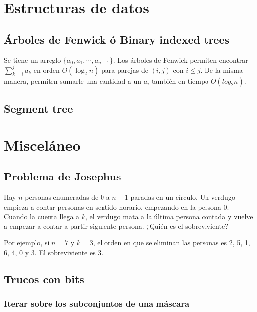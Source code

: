 \documentclass[10pt,letterpaper,twocolumn]{article}
\newcommand{\codigofuente}[1]{

\dotfill
}
\begin{document}
\section{Estructuras de datos}
\subsection{Árboles de Fenwick ó Binary indexed trees}

Se tiene un arreglo $\{a_0, a_1, \cdots, a_{n-1}\}$. Los árboles
de Fenwick permiten encontrar $ \displaystyle \sum_{k=i}^{j} a_k $ en orden $O(\log_{2}{n})$ para parejas de $(i, j)$ con $i \leq j$. De la misma manera, permiten sumarle una cantidad a un $a_i$ también en tiempo $O(log_{2}{n})$.
\medskip
\codigofuente{./src/estructuras/fenwick.cpp}

\subsection{Segment tree}
\codigofuente{./src/estructuras/segment_tree.cpp}

\section{Misceláneo}

\subsection{Problema de Josephus}

Hay $n$ personas enumeradas de $0$ a $n - 1$ paradas en un círculo. Un verdugo empieza a contar personas en sentido horario, empezando en la persona $0$. Cuando la cuenta llega a $k$, el verdugo mata a la última persona contada y vuelve a empezar a contar a partir siguiente persona. ¿Quién es el sobreviviente?

Por ejemplo, si $n = 7$ y $k = 3$, el orden en que se eliminan las personas es 2, 5, 1, 6, 4, 0 y 3. El sobreviviente es 3.

\codigofuente{./src/misc/josephus.cpp}

\subsection{Trucos con bits}
\subsubsection{Iterar sobre los subconjuntos de una máscara}
\end{document}
